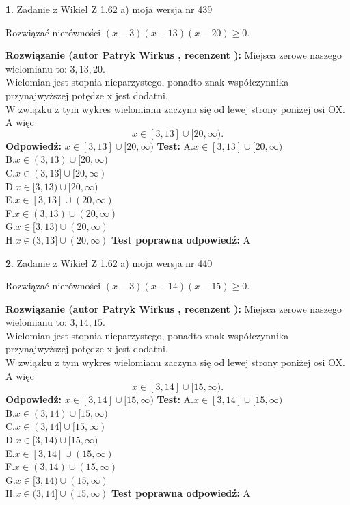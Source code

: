 \documentclass[12pt, a4paper]{article}
\theoremstyle{definition} %
\newtheorem{zad}{}
\newcommand{\zadStart}[1]{\begin{zad}#1\newline}
\newcommand{\zadStop}{\end{zad}}
\newcommand{\rozwStart}[2]{\noindent \textbf{Rozwiązanie (autor #1 , recenzent #2): }\newline}
\newcommand{\rozwStop}{\newline}
\newcommand{\odpStart}{\noindent \textbf{Odpowiedź:}\newline}
\newcommand{\odpStop}{\newline}
\newcommand{\testStart}{\noindent \textbf{Test:}\newline}
\newcommand{\testStop}{\newline}
\newcommand{\kluczStart}{\noindent \textbf{Test poprawna odpowiedź:}\newline}
\newcommand{\kluczStop}{\newline}
\begin{document}
\zadStart{Zadanie z Wikieł Z 1.62 a) moja wersja nr 439}

Rozwiązać nierówności $(x-3)(x-13)(x-20)\ge0$.
\zadStop
\rozwStart{Patryk Wirkus}{}
Miejsca zerowe naszego wielomianu to: $3, 13, 20$.\\
Wielomian jest stopnia nieparzystego, ponadto znak współczynnika przy\linebreak najwyższej potędze x jest dodatni.\\ W związku z tym wykres wielomianu zaczyna się od lewej strony poniżej osi OX. A więc $$x \in [3,13] \cup [20,\infty).$$
\rozwStop
\odpStart
$x \in [3,13] \cup [20,\infty)$
\odpStop
\testStart
A.$x \in [3,13] \cup [20,\infty)$\\
B.$x \in (3,13) \cup [20,\infty)$\\
C.$x \in (3,13] \cup [20,\infty)$\\
D.$x \in [3,13) \cup [20,\infty)$\\
E.$x \in [3,13] \cup (20,\infty)$\\
F.$x \in (3,13) \cup (20,\infty)$\\
G.$x \in [3,13) \cup (20,\infty)$\\
H.$x \in (3,13] \cup (20,\infty)$
\testStop
\kluczStart
A
\kluczStop



\zadStart{Zadanie z Wikieł Z 1.62 a) moja wersja nr 440}

Rozwiązać nierówności $(x-3)(x-14)(x-15)\ge0$.
\zadStop
\rozwStart{Patryk Wirkus}{}
Miejsca zerowe naszego wielomianu to: $3, 14, 15$.\\
Wielomian jest stopnia nieparzystego, ponadto znak współczynnika przy\linebreak najwyższej potędze x jest dodatni.\\ W związku z tym wykres wielomianu zaczyna się od lewej strony poniżej osi OX. A więc $$x \in [3,14] \cup [15,\infty).$$
\rozwStop
\odpStart
$x \in [3,14] \cup [15,\infty)$
\odpStop
\testStart
A.$x \in [3,14] \cup [15,\infty)$\\
B.$x \in (3,14) \cup [15,\infty)$\\
C.$x \in (3,14] \cup [15,\infty)$\\
D.$x \in [3,14) \cup [15,\infty)$\\
E.$x \in [3,14] \cup (15,\infty)$\\
F.$x \in (3,14) \cup (15,\infty)$\\
G.$x \in [3,14) \cup (15,\infty)$\\
H.$x \in (3,14] \cup (15,\infty)$
\testStop
\kluczStart
A
\kluczStop
\end{document}
